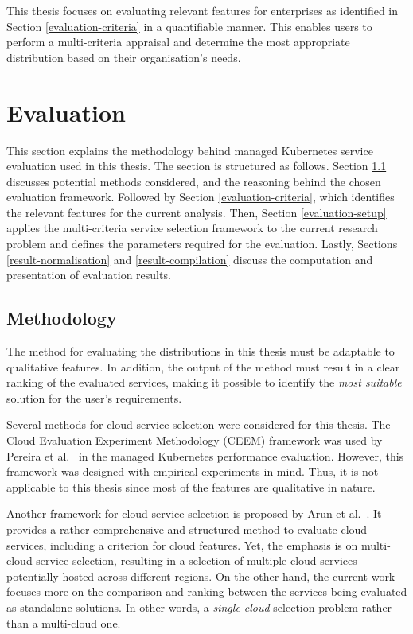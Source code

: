 This thesis focuses on evaluating relevant features for enterprises as identified in Section \ref{evaluation-criteria} in a quantifiable manner. This enables users to perform a multi-criteria appraisal and determine the most appropriate distribution based on their organisation's needs.


\chapter{Evaluation}\label{evaluation-methodology}

This section explains the methodology behind managed Kubernetes service evaluation used in this thesis. The section is structured as follows. Section \ref{sec:multi-criteria-service-selection} discusses potential methods considered, and the reasoning behind the chosen evaluation framework. Followed by Section \ref{evaluation-criteria}, which identifies the relevant features for the current analysis. Then, Section \ref{evaluation-setup} applies the multi-criteria service selection framework to the current research problem and defines the parameters required for the evaluation. Lastly, Sections \ref{result-normalisation} and \ref{result-compilation} discuss the computation and presentation of evaluation results.

\section{Methodology}\label{sec:multi-criteria-service-selection}

The method for evaluating the distributions in this thesis must be
adaptable to qualitative features. In addition, the output of the method
must result in a clear ranking of the evaluated services, making it possible to identify the \textit{most suitable} solution for the user's requirements.

Several methods for cloud service selection were considered for this thesis. The Cloud
Evaluation Experiment Methodology (CEEM) framework was used by Pereira
et al.~\cite{pereiraferreiraPerformanceEvaluationContainers2019} in the
managed Kubernetes performance evaluation. However, this framework was designed with empirical experiments
in mind. Thus, it is not applicable to this thesis since most of the
features are qualitative in nature.

Another framework for cloud service selection is proposed by Arun et
al.~\cite{9284492}. It provides a rather comprehensive and structured
method to evaluate cloud services, including a criterion for cloud
features. Yet, the emphasis is on multi-cloud service selection, resulting in a selection of multiple cloud services potentially hosted across different regions. On the other hand, the
current work focuses more on the comparison and ranking between the
services being evaluated as standalone solutions. In other words, a \textit{single cloud} selection problem rather than a multi-cloud one.

